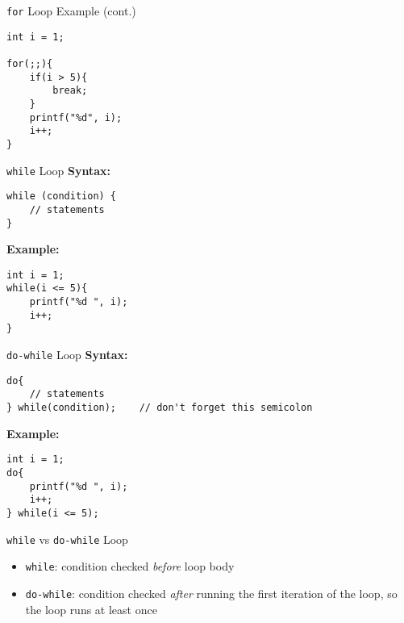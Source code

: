 \documentclass[12pt, aspectratio=169]{beamer}
\begin{document}
        \begin{frame}[fragile]{\texttt{for} Loop Example (cont.)}
        \begin{verbatim}
int i = 1;

for(;;){
    if(i > 5){
        break;
    }
    printf("%d", i);
    i++;
}
        \end{verbatim}
    \end{frame}


    \begin{frame}[fragile]{\texttt{while} Loop}
        \textbf{Syntax:}
        \begin{verbatim}
while (condition) {
    // statements
}
        \end{verbatim}

        \textbf{Example:}
        \begin{verbatim}
int i = 1;
while(i <= 5){
    printf("%d ", i);
    i++;
}
        \end{verbatim}
    \end{frame}


    \begin{frame}[fragile]{\texttt{do-while} Loop}
        \textbf{Syntax:}
        \begin{verbatim}
do{
    // statements
} while(condition);    // don't forget this semicolon
        \end{verbatim}

        \textbf{Example:}
        \begin{verbatim}
int i = 1;
do{
    printf("%d ", i);
    i++;
} while(i <= 5);
        \end{verbatim}
    \end{frame}


    \begin{frame}{\texttt{while} vs \texttt{do-while} Loop}
        \begin{itemize}
            \item \texttt{while}: condition checked \textit{before} loop body
            \item \texttt{do-while}: condition checked \textit{after} running the first iteration of the loop, so the loop runs at least once
        \end{itemize}
    \end{frame}
\end{document}
